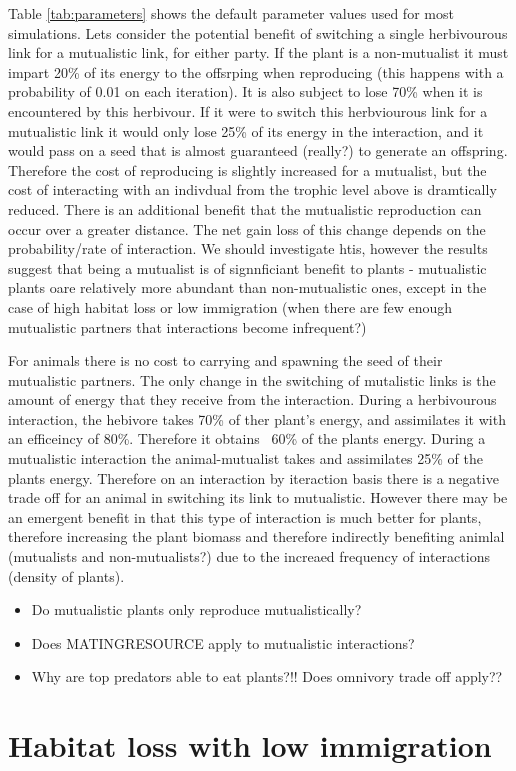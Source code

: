 Table \ref{tab:parameters} shows the default parameter values used for most simulations. Lets consider the potential benefit of switching a single herbivourous link for a mutualistic link, for either party. If the plant is a non-mutualist it must impart 20\% of its energy to the offsrping when reproducing (this happens with a probability of 0.01 on each iteration). It is also subject to lose 70\% when it is encountered by this herbivour. If it were to switch this herbviourous link for a mutualistic link it would only lose 25\% of its energy in the interaction, and it would pass on a seed that is almost guaranteed (really?) to generate an offspring. Therefore the cost of reproducing is slightly increased for a mutualist, but the cost of interacting with an indivdual from the trophic level above is dramtically reduced. There is an additional benefit that the mutualistic reproduction can occur over a greater distance. The net gain loss of this change depends on the probability/rate of interaction. We should investigate htis, however the results suggest that being a mutualist is of signnficiant benefit to plants - mutualistic plants oare relatively more abundant than non-mutualistic ones, except in the case of high habitat loss or low immigration (when there are few enough mutualistic partners that interactions become infrequent?) 

For animals there is no cost to carrying and spawning the seed of their mutualistic partners. The only change in the switching of mutalistic links is the amount of energy that they receive from the interaction. During a herbivourous interaction, the hebivore takes 70\% of ther plant's energy, and assimilates it with an efficeincy of 80\%. Therefore it obtains ~60\% of the plants energy. During a mutualistic interaction the animal-mutualist takes and assimilates 25\% of the plants energy. Therefore on an interaction by iteraction basis there is a negative trade off for an animal in switching its link to mutualistic. However there may be an emergent benefit in that this type of interaction is much better for plants, therefore increasing the plant biomass and therefore indirectly benefiting animlal (mutualists and non-mutualists?) due to the increaed frequency of interactions (density of plants).       

\begin{itemize}
	\item Do mutualistic plants only reproduce mutualistically?
	\item Does MATINGRESOURCE apply to mutualistic interactions?
	\item Why are top predators able to eat plants?!! Does omnivory trade off apply??
\end{itemize}


\section{Habitat loss with low immigration}


